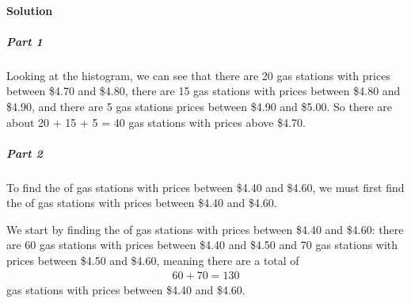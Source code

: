 \documentclass[letterpaper,10pt,english]{jupyterBook}
\begin{document}
\paragraph{Solution}
\label{\detokenize{Ch1 Sampling and Data/1.4 Tables and Charts:id6}}

\subparagraph{Part 1}
\label{\detokenize{Ch1 Sampling and Data/1.4 Tables and Charts:id7}}
\sphinxAtStartPar
Looking at the histogram, we can see that there are 20 gas stations with prices between \$4.70 and \$4.80, there are 15 gas stations with prices between \$4.80 and \$4.90, and there are 5 gas stations prices between \$4.90 and \$5.00. So there are about 20 + 15 + 5 = 40 gas stations with prices above \$4.70.


\subparagraph{Part 2}
\label{\detokenize{Ch1 Sampling and Data/1.4 Tables and Charts:id8}}
\sphinxAtStartPar
To find the  of gas stations with prices between \$4.40 and \$4.60, we must first find the  of gas stations with prices between \$4.40 and \$4.60.

\sphinxAtStartPar
We start by finding the  of gas stations with prices between \$4.40 and \$4.60: there are 60 gas stations with prices between \$4.40 and \$4.50 and 70 gas stations with prices between \$4.50 and \$4.60, meaning there are a total of
\begin{equation*}
\begin{split}60 + 70 = 130\end{split}
\end{equation*}
\sphinxAtStartPar
gas stations with prices between \$4.40 and \$4.60.
\end{document}
